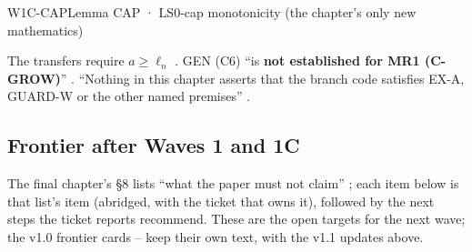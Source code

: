 \begin{card}{W1C-CAP}{Lemma CAP · LS0-cap monotonicity (the chapter's only new mathematics)}
\begin{notproved}
The transfers require $a\ge\ell_n$ . GEN (C6) ``is \textbf{not established for MR1 (C-GROW)}'' . ``Nothing in this chapter asserts that the branch code satisfies EX-A, GUARD-W or the other named premises'' .
\end{notproved}
\end{card}


\subsection{Frontier after Waves 1 and 1C}\label{sec:loop:frontier}
The final chapter's §8 lists ``what the paper must not claim'' ; each item below is that list's item (abridged, with the ticket that owns it), followed by the next steps the ticket reports recommend. These are the open targets for the next wave; the v1.0 frontier cards -- keep their own text, with the v1.1 updates above.
